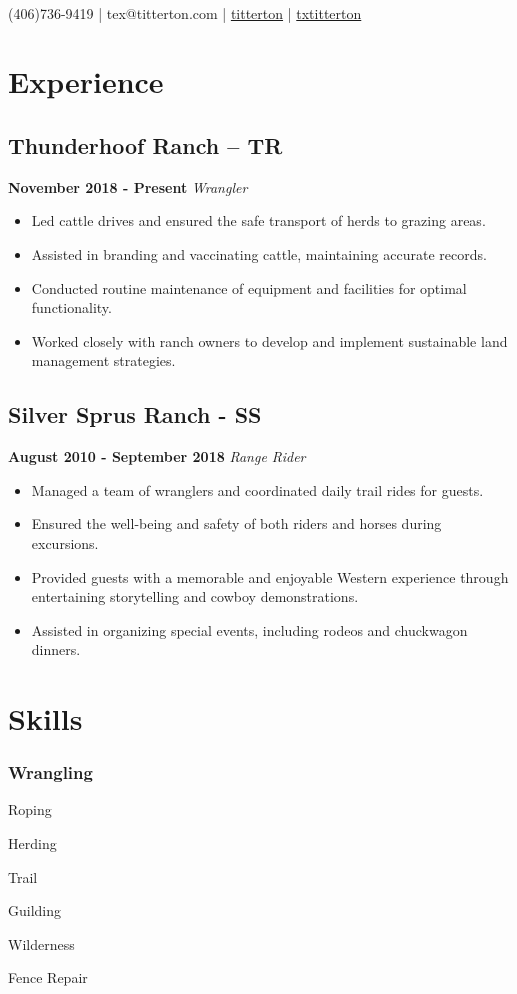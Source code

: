 \documentclass[a4paper]{article}
\author{Tex Titterton}
\makeatletter
\renewcommand{\maketitle}{
  \begin{center}
  {\huge\bfseries\theauthor} \\ %
    (406)736-9419 |
    tex@titterton.com |
    \href{https://github.com/titterton}{titterton} |
    \href{https://linkedin.com/txtitterton}{txtitterton}
    \end{center}
  }
\makeatother
\begin{document}
\maketitle

\section{Experience}
\subsection{Thunderhoof Ranch -- TR}
    \textbf{November 2018 - Present}
    \textit{Wrangler}
\begin{itemize}
    \item Led cattle drives and ensured the safe transport of herds to grazing areas.
    \item Assisted in branding and vaccinating cattle, maintaining accurate records.
    \item Conducted routine maintenance of equipment and facilities for optimal functionality.
    \item Worked closely with ranch owners to develop and implement sustainable land management strategies.
\end{itemize}

\subsection{Silver Sprus Ranch - SS}
    \textbf{August 2010 - September 2018}
    \textit{Range Rider}
\begin{itemize}
    \item Managed a team of wranglers and coordinated daily trail rides for guests.
    \item Ensured the well-being and safety of both riders and horses during excursions.
    \item Provided guests with a memorable and enjoyable Western experience through entertaining storytelling and cowboy demonstrations.
    \item Assisted in organizing special events, including rodeos and chuckwagon dinners.
\end{itemize}

\section{Skills}
\subsubsection
  {Wrangling}
\begin{itemize*}
  \item Roping
  \item Herding
  \item Trail
  \item Guilding
  \item Wilderness
  \item Fence Repair
\end{itemize*}
\end{document}
